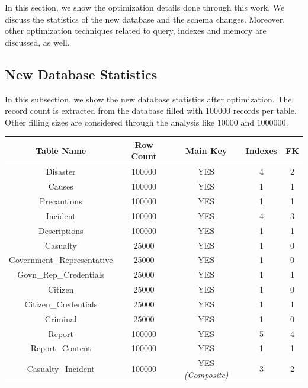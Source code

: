 In this section, we show the optimization details done through this work. We discuss the statistics of the new database and the schema changes. Moreover, other optimization techniques related to query, indexes and memory are discussed, as well.

\subsection{New Database Statistics}
In this subsection, we show the new database statistics after optimization. The record count is extracted from the database filled with $100000$ records per table. Other filling sizes are considered through the analysis like $10000$ and $1000000$. \\

\begin{tabular}{||c | c | c | c | c||} 
 \hline
 Table Name & Row Count & Main Key & Indexes & FK  \\ [0.5ex] 
 \hline\hline
 Disaster & 100000 & YES & 4 & 2 \\ 
 \hline\hline
 Causes & 100000 & YES & 1 & 1 \\ 
 \hline\hline
 Precautions & 100000 & YES & 1 & 1 \\ 
 \hline\hline
 Incident & 100000 & YES & 4 & 3 \\ 
 \hline\hline
 Descriptions & 100000 & YES & 1 & 1 \\ 
 \hline\hline
 Casualty & 25000 & YES & 1 & 0 \\ 
 \hline
 Government\_Representative & 25000 & YES & 1 & 0 \\
 \hline
 Govn\_Rep\_Credentials & 25000 & YES & 1 & 1 \\
 \hline
 Citizen & 25000 & YES & 1 & 0 \\
 \hline
 Citizen\_Credentials & 25000 & YES & 1 & 1 \\
 \hline
 Criminal & 25000 & YES & 1 & 0 \\
 \hline
 Report & 100000 & YES & 5 & 4 \\
 \hline
 Report\_Content & 100000 & YES & 1 & 1 \\
 \hline
 Casualty\_Incident & 100000 & YES \emph{(Composite)} & 3 & 2 \\ [1ex] 
 \hline
\end{tabular} \\

